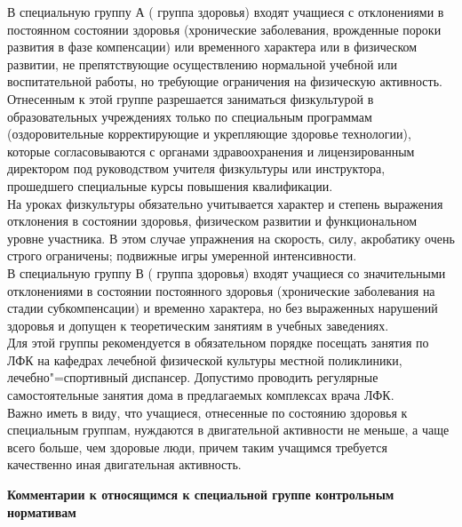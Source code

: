 \begin{flushleft}
В специальную группу А (\MakeUppercase{} группа здоровья) входят учащиеся с
отклонениями в постоянном состоянии здоровья (хронические заболевания, врожденные
пороки развития в фазе компенсации) или временного характера или в физическом развитии,
не препятствующие осуществлению нормальной учебной или воспитательной работы, но требующие
ограничения на физическую активность. Отнесенным к этой группе разрешается
заниматься физкультурой в образовательных учреждениях только по специальным программам (оздоровительные
корректирующие и укрепляющие здоровье технологии), которые согласовываются с органами здравоохранения и
лицензированным директором под руководством учителя физкультуры или инструктора,
прошедшего специальные курсы повышения квалификации.\\

На уроках физкультуры обязательно учитывается характер и степень выражения
отклонения в состоянии здоровья, физическом развитии и функциональном уровне участника.
В этом случае упражнения на скорость, силу, акробатику очень строго ограничены; подвижные игры умеренной
интенсивности.\\

В специальную группу В (\MakeUppercase{} группа здоровья) входят учащиеся со значительными отклонениями
в состоянии постоянного здоровья (хронические заболевания на стадии субкомпенсации) и временно
характера, но без выраженных нарушений здоровья и допущен к теоретическим занятиям
в учебных заведениях.\\

Для этой группы рекомендуется в обязательном порядке посещать занятия по ЛФК на кафедрах
лечебной физической культуры местной поликлиники, лечебно"=спортивный диспансер.
Допустимо проводить регулярные самостоятельные занятия дома в предлагаемых комплексах
врача ЛФК. \\

Важно иметь в виду, что учащиеся, отнесенные по состоянию здоровья к специальным группам, нуждаются в двигательной активности не
меньше, а чаще всего больше, чем здоровые люди, причем таким учащимся
требуется качественно иная двигательная активность.



\newpage
\begin{center}
    \textbf{Комментарии к относящимся к специальной группе контрольным нормативам}
\end{center}
\vspace*{14pt}


\end{flushleft}
